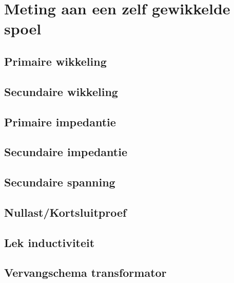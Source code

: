 \section{Meting aan een zelf gewikkelde spoel}
\subsection{Primaire wikkeling}
\subsection{Secundaire wikkeling}
\subsection{Primaire impedantie}
\subsection{Secundaire impedantie}
\subsection{Secundaire spanning}
\subsection{Nullast/Kortsluitproef}
\subsection{Lek inductiviteit}
\subsection{Vervangschema transformator}
